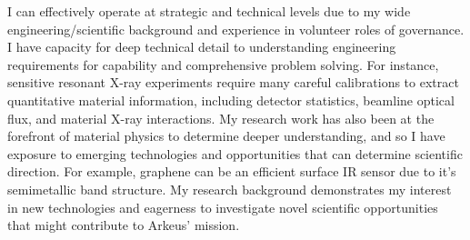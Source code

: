 \documentclass[10pt,a4paper,ragged2e,withhyper,paragraphstrue]{altacv}
\begin{document}
{    %
    I can effectively operate at strategic and technical levels due to my wide engineering/scientific background and experience in volunteer roles of governance. I have capacity for deep technical detail to understanding engineering requirements for capability and comprehensive problem solving. For instance, sensitive resonant X-ray experiments require many careful calibrations to extract quantitative material information, including detector statistics, beamline optical flux, and material X-ray interactions. My research work has also been at the forefront of material physics to determine deeper understanding, and so I have exposure to emerging technologies and opportunities that can determine scientific direction. For example, graphene can be an efficient surface IR sensor due to it's semimetallic band structure.    
    My research background demonstrates my interest in new technologies and eagerness to investigate novel scientific opportunities that might contribute to Arkeus' mission.

}
\end{document}
